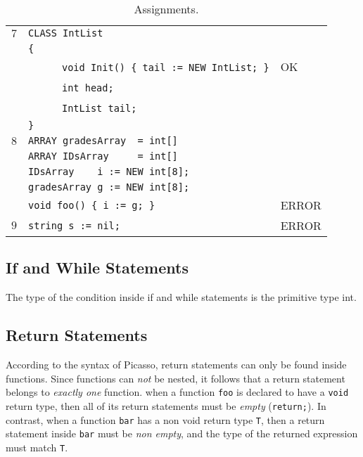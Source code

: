 \documentclass{article}
\begin{document}
\begin{table}[h]
\begin{tabular}{|l|l|l|}
 $7$ & \verb"CLASS IntList"                               &    \\
     & \verb"{"                                           &    \\
     & ~ ~ ~ ~\verb"void Init() { tail := NEW IntList; }" & OK \\
     & ~ ~ ~ ~\verb"int head;"                            &    \\
     & ~ ~ ~ ~\verb"IntList tail;"                        &    \\
     & \verb"}"                                           &    \\
\hline
 $8$ & \verb"ARRAY gradesArray  = int[]"   &       \\
     & \verb"ARRAY IDsArray     = int[]"   &       \\
     & \verb"IDsArray    i := NEW int[8];" &       \\
     & \verb"gradesArray g := NEW int[8];" &       \\
     & \verb"void foo() { i := g; }"       & ERROR \\
\hline
 $9$ & \verb"string s := nil;" & ERROR \\
\hline
\end{tabular}
\caption{Assignments.
\label{Table_Code_Examples_Assignments}}
\end{table}
\newpage
\subsection{If and While Statements}
\label{subsection_If_And_While_Statements}
The type of the condition inside if and while statements is the primitive type int.
\subsection{Return Statements}
\label{subsection_Return_Statements}
According to the syntax of Picasso, return statements can only be found inside functions.
Since functions can \textit{not} be nested,
it follows that a return statement belongs to \textit{exactly one} function.
when a function \verb"foo" is declared to have a \verb"void" return type,
then all of its return statements must be \textit{empty} (\verb"return;").
In contrast, when a function \verb"bar" has a non void return type \verb"T",
then a return statement inside \verb"bar" must be \textit{non empty},
and the type of the returned expression must match \verb"T".
\end{document}
